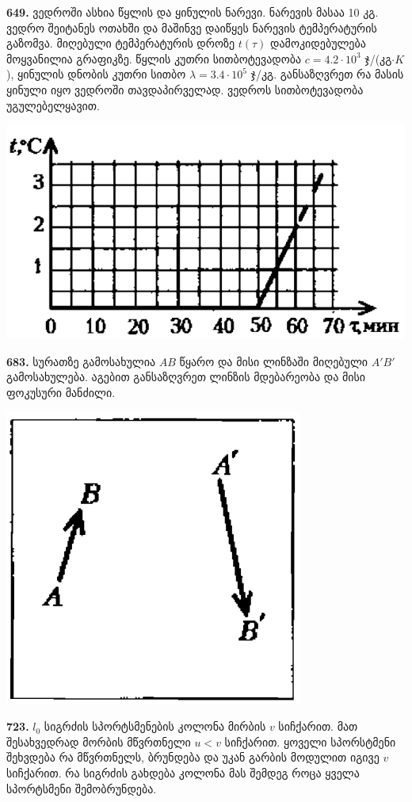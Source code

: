 \documentclass[12pt,a4paper,]{report}
\begin{document}
\textbf{649.} ვედროში ასხია წყლის და ყინულის ნარევი. ნარევის მასაა 10 კგ. ვედრო შეიტანეს ოთახში და მაშინვე დაიწყეს ნარევის ტემპერატურის გაზომვა. მიღებული ტემპერატურის დროზე $t(\tau)$ დამოკიდებულება მოყვანილია გრაფიკზე. წყლის კუთრი სითბოტევადობა $c=4.2\cdot10^3$ ჯ/(კგ$\cdot K$), ყინულის დნობის კუთრი სითბო $\lambda=3.4\cdot10^5$ ჯ/კგ. განსაზღვრეთ რა მასის ყინული იყო ვედროში თავდაპირველად. ვედროს სითბოტევადობა უგულებელყავით. 
		\begin{center}
			\includegraphics[scale=0.5]{images/F649.png}
		\end{center}

\textbf{683.} სურათზე გამოსახულია $AB$ წყარო და მისი ლინზაში მიღებული $A'B'$ გამოსახულება. აგებით განსაზღვრეთ ლინზის მდებარეობა და მისი ფოკუსური მანძილი. 
		\begin{center}
			\includegraphics[scale=0.5]{images/F683.png}
		\end{center}
	
\textbf{723.} $l_0$ სიგრძის სპორტსმენების კოლონა მირბის $v$ სიჩქარით. მათ შესახვედრად მორბის მწვრთნელი $u<v$ სიჩქარით. ყოველი სპორსტმენი შეხვდება რა მწვრთნელს, ბრუნდება და უკან გარბის მოდულით იგივე $v$ სიჩქარით. რა სიგრძის გახდება კოლონა მას შემდეგ როცა ყველა სპორტსმენი შემობრუნდება.
		
\end{document}
